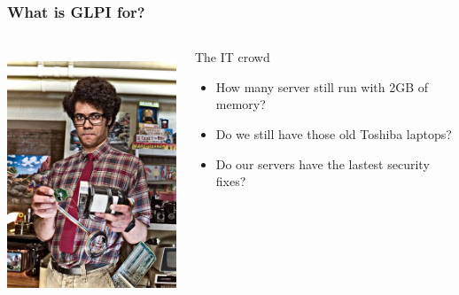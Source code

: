 \documentclass{beamer}
\begin{document}
\begin{frame}
    \frametitle{What is GLPI for?}

 \begin{columns}
 \begin{column}{0.35\textwidth}
         \includegraphics[height=7.5cm]{./pics/itcrowd.jpg}
 \end{column}
 \begin{column}{0.65\textwidth}
    \begin{block}{The IT crowd}
        \begin{itemize}
            \item How many server still run with 2GB of memory?
            \item Do we still have those old Toshiba laptops?
            \item Do our servers have the lastest security fixes?
        \end{itemize}
    \end{block}
 \end{column}
\end{columns}

 \end{frame}
\end{document}
